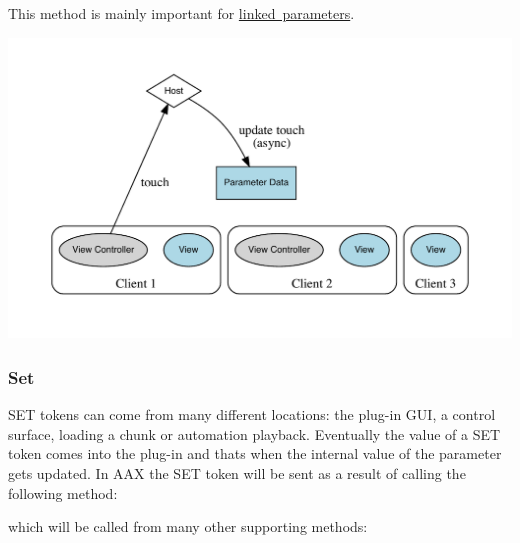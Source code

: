 This method is mainly important for \mbox{\hyperlink{a00824}{linked parameters}}.


\begin{DoxyImage}
\includegraphics[width=\textwidth,height=\textheight/2,keepaspectratio=true]{dot_aax_parameter_entities_touch_handled}
\end{DoxyImage}
 \hypertarget{a00822_tokenProtocol_introductionToTokens_set}{}\subsubsection{Set}\label{a00822_tokenProtocol_introductionToTokens_set}
S\+ET tokens can come from many different locations\+: the plug-\/in G\+UI, a control surface, loading a chunk or automation playback. Eventually the value of a S\+ET token comes into the plug-\/in and that\textquotesingle{}s when the internal value of the parameter gets updated. In A\+AX the S\+ET token will be sent as a result of calling the following method\+:


\begin{DoxyCode}{0}
\DoxyCodeLine{\{}
\DoxyCodeLine{\};}
\end{DoxyCode}


which will be called from many other supporting methods\+:


